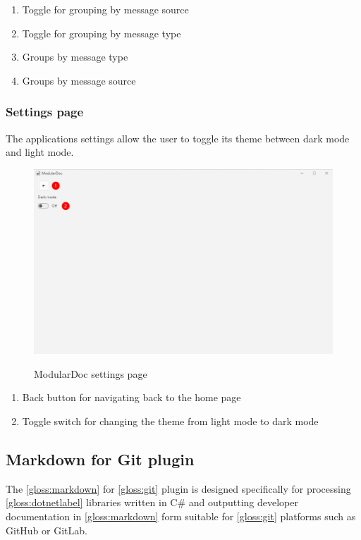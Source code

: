 \begin{enumerate}
    \item Toggle for grouping by message source
    \item Toggle for grouping by message type
    \item Groups by message type
    \item Groups by message source
\end{enumerate}

\pagebreak
\subsubsection{Settings page}

The applications settings allow the user to toggle its theme between dark mode and light mode.

\begin{figure}[H]
    \includegraphics[width=\linewidth]{img/modularDocSettings.png}
    \label{fig:modularDocSettingsPage}
    \caption{ModularDoc settings page}
\end{figure}

\begin{enumerate}
    \item Back button for navigating back to the home page
    \item Toggle switch for changing the theme from light mode to dark mode
\end{enumerate}

\subsection{Markdown for Git plugin}

The \ref{gloss:markdown} for \ref{gloss:git} plugin is designed specifically for processing \ref{gloss:dotnetlabel} libraries written in C\# and outputting developer documentation in \ref{gloss:markdown} form suitable for \ref{gloss:git} platforms such as GitHub or GitLab.

